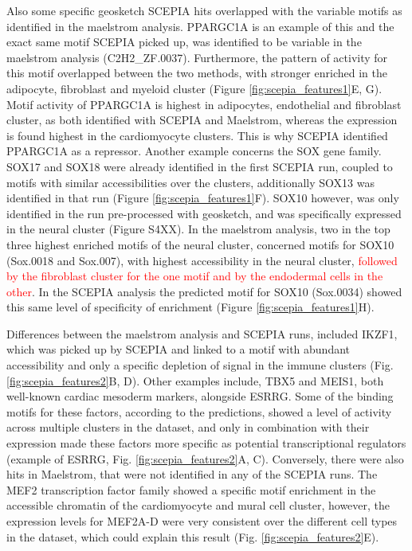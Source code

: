 Also some specific geosketch SCEPIA hits overlapped with the variable motifs as identified in the maelstrom analysis. PPARGC1A is an example of this and the exact same motif SCEPIA picked up, was identified to be variable in the maelstrom analysis (C2H2\_ZF.0037). Furthermore, the pattern of activity for this motif overlapped between the two methods, with stronger enriched in the adipocyte, fibroblast and myeloid cluster (Figure \ref{fig:scepia_features1}E, G). Motif activity of PPARGC1A is highest in adipocytes, endothelial and fibroblast cluster, as both identified with SCEPIA and Maelstrom, whereas the expression is found highest in the cardiomyocyte clusters. This is why SCEPIA identified PPARGC1A as a repressor. Another example concerns the SOX gene family. SOX17 and SOX18 were already identified in the first SCEPIA run, coupled to motifs with similar accessibilities over the clusters, additionally SOX13 was identified in that run (Figure \ref{fig:scepia_features1}F). SOX10 however, was only identified in the run pre-processed with geosketch, and was specifically expressed in the neural cluster (Figure S4XX). In the maelstrom analysis, two in the top three highest enriched motifs of the neural cluster, concerned motifs for SOX10 (Sox.0018 and Sox.007), with highest accessibility in the neural cluster, \textcolor{red}{followed by the fibroblast cluster for the one motif and by the endodermal cells in the other}. In the SCEPIA analysis the predicted motif for SOX10 (Sox.0034) showed this same level of specificity of enrichment (Figure \ref{fig:scepia_features1}H).

Differences between the maelstrom analysis and SCEPIA runs, included IKZF1, which was picked up by SCEPIA and linked to a motif with abundant accessibility and only a specific depletion of signal in the immune clusters (Fig. \ref{fig:scepia_features2}B, D). Other examples include, TBX5 and MEIS1, both well-known cardiac mesoderm markers, alongside ESRRG. Some of the binding motifs for these factors, according to the predictions, showed a level of activity across multiple clusters in the dataset, and only in combination with their expression made these factors more specific as potential transcriptional regulators (example of ESRRG, Fig. \ref{fig:scepia_features2}A, C). Conversely, there were also hits in Maelstrom, that were not identified in any of the SCEPIA runs. The MEF2 transcription factor family showed a specific motif enrichment in the accessible chromatin of the cardiomyocyte and mural cell cluster, however, the expression levels for MEF2A-D were very consistent over the different cell types in the dataset, which could explain this result (Fig. \ref{fig:scepia_features2}E).


